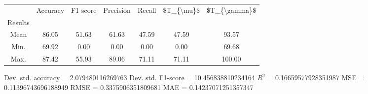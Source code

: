\begin{tabular}{|c|c|c|c|c|c|c|}
\toprule
{} &  Accuracy &  F1 score &  Precision &  Recall &  \$T\_\{\textbackslash mu\}\$ &  \$T\_\{\textbackslash gamma\}\$ \\
Results &           &           &            &         &            &               \\
\hline
Mean    &     86.05 &     51.63 &      61.63 &   47.59 &      47.59 &         93.57 \\
Min.    &     69.92 &      0.00 &       0.00 &    0.00 &       0.00 &         69.68 \\
Max.    &     87.42 &     55.93 &      89.06 &   71.11 &      71.11 &        100.00 \\
\bottomrule
\end{tabular}

 Dev. std. accuracy = 2.079480116269763
 Dev. std. F1-score = 10.456838810234164
 $R^2$ = 0.16659577928351987
 MSE = 0.11396743696188949
 RMSE = 0.3375906351809681
 MAE = 0.14237071251357347